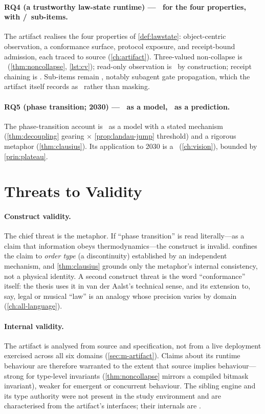 \paragraph{RQ4 (a trustworthy law-state runtime) --- \admitted\ for the four
properties, with \partialstat/\openstat\ sub-items.} The artifact realises the four
properties of \cref{def:lawstate}: object-centric observation, a conformance
surface, protocol exposure, and receipt-bound admission, each traced to source
(\cref{ch:artifact}). Three-valued non-collapse is \admitted\ (\cref{thm:noncollapse},
\cref{lst:cv}); read-only observation is \admitted\ by construction; receipt
chaining is \admitted. Sub-items remain \openstat, notably subagent gate
propagation, which the artifact itself records as \openstat\ rather than masking.

\paragraph{RQ5 (phase transition; 2030) --- \admitted\ as a model, \forecast\ as a
prediction.} The phase-transition account is \admitted\ as a model with a stated
mechanism (\cref{thm:decoupling} gearing $\times$ \cref{prop:landau-jump} threshold)
and a rigorous metaphor (\cref{thm:clausius}). Its application to 2030 is a
\forecast\ (\cref{ch:vision}), bounded by \cref{prin:plateau}.

\section{Threats to Validity}
\label{sec:disc-threats}

\paragraph{Construct validity.} The chief threat is the metaphor. If ``phase
transition'' is read literally---as a claim that information obeys
thermodynamics---the construct is invalid.  confines the claim to
\emph{order type} (a discontinuity) established by an independent mechanism, and
\cref{thm:clausius} grounds only the metaphor's internal consistency, not a physical
identity. A second construct threat is the word ``conformance'' itself: the thesis
uses it in van der Aalst's technical sense, and its extension to, say, legal or
musical ``law'' is an analogy whose precision varies by domain
(\cref{ch:all-language}).

\paragraph{Internal validity.} The artifact is analysed from source and
specification, not from a live deployment exercised across all six domains
(\cref{sec:m-artifact}). Claims about its runtime behaviour are therefore warranted
to the extent that source implies behaviour---strong for type-level invariants
(\cref{thm:noncollapse} mirrors a compiled bitmask invariant), weaker for emergent
or concurrent behaviour. The sibling  engine and its type authority
were not present in the study environment and are characterised from the artifact's
interfaces; their internals are \unknownstat.

